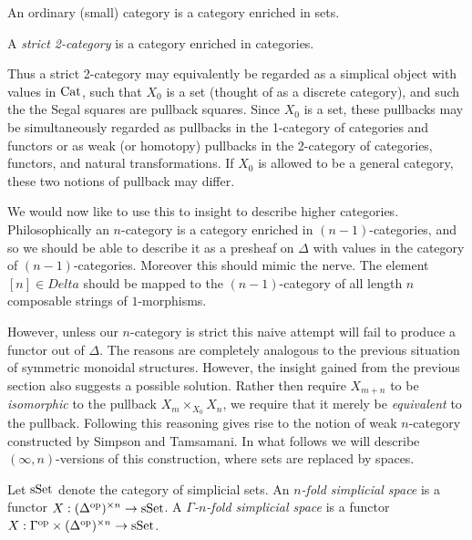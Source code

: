 \documentclass{amsart}
\begin{document}
\begin{example}
	An ordinary (small) category is a category enriched in sets.
\end{example}

\begin{example}
	A {\em strict 2-category} is a category enriched in categories.
\end{example}

Thus a strict 2-category may equivalently be regarded as a simplical object with values in $\mathrm{Cat}$, such that $X_0$ is a set (thought of as a discrete category), and such the the Segal squares are pullback squares. Since $X_0$ is a set, these pullbacks may be simultaneously regarded as pullbacks in the 1-category of categories and functors or as weak (or homotopy) pullbacks in the 2-category of categories, functors, and natural transformations. If $X_0$ is allowed to be a general category, these two notions of pullback may differ. 

We would now like to use this to insight to describe higher categories. Philosophically an $n$-category is a category enriched in $(n-1)$-categories, and so we should be able to describe it as a presheaf on $\Delta$ with values in the category of $(n-1)$-categories. Moreover this should mimic the nerve. The element $[n] \in Delta$ should be mapped to the $(n-1)$-category of all length $n$ composable strings of $1$-morphisms. 

However, unless our $n$-category is strict this naive attempt will fail to produce a functor out of $\Delta$. The reasons are completely analogous to the previous situation of symmetric monoidal structures. However, the insight gained from the previous section also suggests a possible solution. Rather then require $X_{m+n}$ to be {\em isomorphic} to the pullback $X_m \times_{X_0} X_n$, we require that it merely be {\em equivalent} to the pullback. 
Following this reasoning gives rise to the notion of weak $n$-category constructed by Simpson and Tamsamani. In what follows we will describe $(\infty,n)$-versions of this construction, where sets are replaced by spaces.  

\begin{definition}
	Let $\mathrm{sSet}$ denote the category of simplicial sets. An {\em $n$-fold simplicial space} is a functor $X: (\Delta^\textrm{op})^{\times n} \to \mathrm{sSet}$. A {\em $\Gamma$-$n$-fold simplicial space} is a functor $X: \Gamma^\textrm{op} \times (\Delta^\textrm{op})^{\times n} \to \mathrm{sSet}$.
\end{definition}
\end{document}
